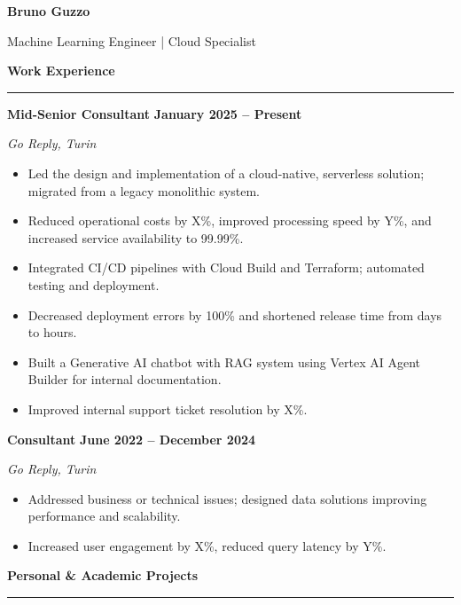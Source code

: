 \documentclass[9pt, a4paper]{article}
\newcommand{\cvsection}[1]{%
	\vspace{4pt}\par
	{\Large\bfseries\color{sectionblue}#1}\par
	\vspace{2pt}\hrule\vspace{6pt}
}
\newcommand{\cvsubsection}[3]{%
	\par {\large\bfseries #1} \hfill {\bfseries #2} \par {\textit{#3}} \vspace{4pt}
}
\begin{document}
	
	\begin{center}
		{\Huge\bfseries Bruno Guzzo}\par
		\vspace{4pt}
		{\Large Machine Learning Engineer | Cloud Specialist}
	\end{center}
	\vspace{10pt}
	
	\begin{minipage}[t]{0.70\linewidth}
		\vspace{0pt} %
		
		\cvsection{Work Experience}
		
		\cvsubsection{Mid-Senior Consultant}{January 2025 -- Present}{Go Reply, Turin}
		
		\begin{itemize}[leftmargin=*, nosep]
			\item Led the design and implementation of a cloud-native, serverless solution; migrated from a legacy monolithic system.
			\item Reduced operational costs by X\%, improved processing speed by Y\%, and increased service availability to 99.99\%.
			\item Integrated CI/CD pipelines with Cloud Build and Terraform; automated testing and deployment.
			\item Decreased deployment errors by 100\% and shortened release time from days to hours.
			\item Built a Generative AI chatbot with RAG system using Vertex AI Agent Builder for internal documentation.
			\item Improved internal support ticket resolution by X\%.
		\end{itemize}
		
		\vspace{6pt}
		\cvsubsection{Consultant}{June 2022 -- December 2024}{Go Reply, Turin}
		\begin{itemize}[leftmargin=*, nosep]
			\item Addressed business or technical issues; designed data solutions improving performance and scalability.
			\item Increased user engagement by X\%, reduced query latency by Y\%.
		\end{itemize}
		
		\vspace{10pt}\par
		\cvsection{Personal \& Academic Projects}
		

\end{minipage}
\end{document}
